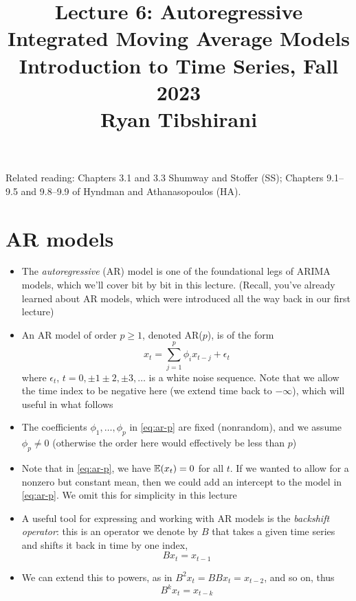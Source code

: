 \documentclass{article}
\title{Lecture 6: Autoregressive Integrated Moving Average Models \\ \smallskip  
\large Introduction to Time Series, Fall 2023 \\ \smallskip
Ryan Tibshirani}
\date{}
\begin{document}
\maketitle
\RaggedRight
\vspace{-50pt}

Related reading: Chapters 3.1 and 3.3 Shumway and Stoffer (SS); Chapters
9.1--9.5 and 9.8--9.9 of Hyndman and Athanasopoulos (HA).   

\section{AR models}

\begin{itemize}
\item The \emph{autoregressive} (AR) model is one of the foundational legs of
  ARIMA models, which we'll cover bit by bit in this lecture. (Recall, you've
  already learned about AR models, which were introduced all the way back in our 
  first lecture)  

\item An AR model of order $p \geq 1$, denoted AR($p$), is of the form
  \begin{equation}
  \label{eq:ar-p}
  x_t = \sum_{j=1}^p \phi_i x_{t-j} + \epsilon_t
  \end{equation}
  where $\epsilon_t$, $t = 0, \pm 1 \pm 2, \pm 3,\dots$ is a white noise
  sequence. Note that we allow the time index to be negative here (we extend
  time back to $-\infty$), which will useful in what follows

\item The coefficients $\phi_1,\dots,\phi_p$ in \eqref{eq:ar-p} are fixed
  (nonrandom), and we assume $\phi_p \not= 0$ (otherwise the order here would
  effectively be less than $p$)   

\item Note that in \eqref{eq:ar-p}, we have $\mathbb{E}(x_t) = 0$ for all $t$. If we
  wanted to allow for a nonzero but constant mean, then we could add an
  intercept to the model in \eqref{eq:ar-p}. We omit this for simplicity in this 
  lecture  

\item A useful tool for expressing and working with AR models is the
  \emph{backshift operator}: this is an operator we denote by $B$ that takes a 
  given time series and shifts it back in time by one index,
  \[
  B x_t = x_{t-1}
  \]

\item We can extend this to powers, as in $B^2 x_t = B B x_t = x_{t-2}$, and so
  on, thus   
  \[
  B^k x_t = x_{t-k} 
  \]


\end{itemize}
\end{document}
